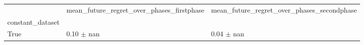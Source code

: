 \begin{tabular}{lll}
\toprule
 & mean_future_regret_over_phases_firstphase & mean_future_regret_over_phases_secondphase \\
constant_dataset &  &  \\
\midrule
True & 0.10 $\pm$ nan & 0.04 $\pm$ nan \\
\bottomrule
\end{tabular}
